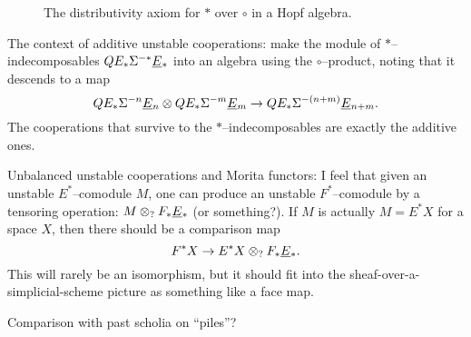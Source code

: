 \begin{figure}
\begin{center}
\end{center}
\caption{The distributivity axiom for $\ast$ over $\circ$ in a Hopf algebra.}\label{DistributivityDiagram}
\end{figure}

The context of additive unstable cooperations: make the module of $\ast$--indecomposables $QE_* \Sigma^{-*} \smash{\underline{E}}_{*}$ into an algebra using the $\circ$--product, noting that it descends to a map \[QE_* \Sigma^{-n} \smash{\underline{E}}_{n} \otimes QE_* \Sigma^{-m} \smash{\underline{E}}_{m} \to QE_* \Sigma^{-(n+m)} \smash{\underline{E}}_{n+m}.\]  The cooperations that survive to the $\ast$--indecomposables are exactly the additive ones.

Unbalanced unstable cooperations and Morita functors: I feel that given an unstable $E^*$--comodule $M$, one can produce an unstable $F^*$--comodule by a tensoring operation: $M \otimes_? F_* \smash{\underline{E}}_{*}$ (or something?).  If $M$ is actually $M = E^* X$ for a space $X$, then there should be a comparison map \[F^* X \to E^* X \otimes_? F_* \smash{\underline{E}}_{*}.\]  This will rarely be an isomorphism, but it should fit into the sheaf-over-a-simplicial-scheme picture as something like a face map.

Comparison with past scholia on ``piles''?



